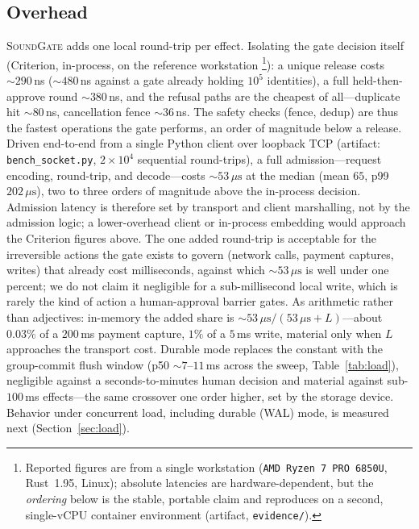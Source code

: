 \documentclass[10pt,journal,compsoc]{IEEEtran}
\newcommand{\CPUMODEL}{AMD Ryzen~7 PRO 6850U}
\newcommand{\SOCKETMED}{53\,\mu\mathrm{s}}%
\newcommand{\sys}{\textsc{SoundGate}}
\begin{document}
\subsection{Overhead}
\sys{} adds one local round-trip per effect. Isolating the gate decision
itself (Criterion, in-process, on the reference workstation%
\footnote{Reported figures are from a single workstation
(\texttt{\CPUMODEL}, Rust~1.95, Linux); absolute latencies are
hardware-dependent, but the \emph{ordering} below is the stable, portable
claim and reproduces on a second, single-vCPU container environment
(artifact, \texttt{evidence/}).}): a unique release
costs ${\sim}290$\,ns (${\sim}480$\,ns against a gate already holding $10^5$
identities), a full held-then-approve round ${\sim}380$\,ns, and the refusal
paths are the cheapest of all---duplicate hit ${\sim}80$\,ns, cancellation
fence ${\sim}36$\,ns. The safety checks (fence, dedup) are thus the fastest
operations the gate performs, an order of magnitude below a release. Driven end-to-end from a single Python client over loopback TCP (artifact:
\texttt{bench\_socket.py}, $2{\times}10^4$ sequential round-trips), a full
admission---request encoding, round-trip, and decode---costs ${\sim}\SOCKETMED$
at the median (mean $65$, p99 $202\,\mu\mathrm{s}$), two to three orders of
magnitude above the in-process decision. Admission latency is therefore set by
transport and client marshalling, not by the admission logic; a lower-overhead
client or in-process embedding would approach the Criterion figures above. The
one added round-trip is acceptable for the irreversible actions the gate exists
to govern (network calls, payment captures, writes) that already cost
milliseconds, against which ${\sim}53\,\mu\mathrm{s}$ is well under one percent;
we do not claim it negligible for a sub-millisecond local write, which is rarely
the kind of action a human-approval barrier gates. As arithmetic rather than
adjectives: in-memory the added share is
${\sim}53\,\mu\mathrm{s}/(53\,\mu\mathrm{s}+L)$---about $0.03\%$ of a
$200$\,ms payment capture, $1\%$ of a $5$\,ms write, material only when $L$
approaches the transport cost. Durable mode replaces the constant with the
group-commit flush window (p50 ${\sim}7$--$11$\,ms across the sweep,
Table~\ref{tab:load}), negligible against a seconds-to-minutes human decision
and material against sub-$100$\,ms effects---the same crossover one order
higher, set by the storage device. Behavior under concurrent
load, including durable (WAL) mode, is measured next
(Section~\ref{sec:load}).
\end{document}
